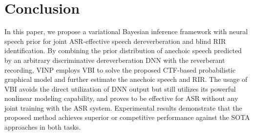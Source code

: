 \section{Conclusion}
\label{sec:conclusion}
In this paper, we propose a variational Bayesian inference framework with neural speech prior for joint ASR-effective speech dereverberation and blind RIR identification. 
By combining the prior distribution of anechoic speech predicted by an arbitrary discriminative dereverberation DNN with the reverberant recording, VINP employs VBI to solve the proposed CTF-based probabilistic graphical model and further estimate the anechoic speech and RIR.
The usage of VBI avoids the direct utilization of DNN output but still utilizes its powerful nonlinear modeling capability, and proves to be effective for ASR without any joint training with the ASR system.
Experimental results demonstrate that the proposed method achieves superior or competitive performance against the SOTA approaches in both tasks.
